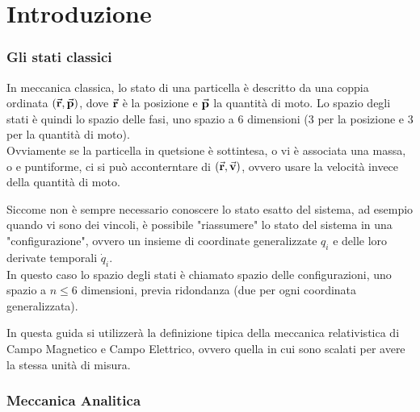 \section{Introduzione}
\subsubsection*{Gli stati classici} 
In meccanica classica, lo stato di una particella è descritto da una coppia ordinata $(\vec{\textbf{r}}, \vec{\textbf{p}})$, dove $\vec{\textbf{r}}$ è la posizione e $\vec{\textbf{p}}$ la quantità di moto. Lo spazio degli stati è quindi lo spazio delle fasi, uno spazio a 6 dimensioni (3 per la posizione e 3 per la quantità di moto).\\
Ovviamente se la particella in quetsione è sottintesa, o vi è associata una massa, o e puntiforme, ci si può acconterntare di $(\vec{\textbf{r}}, \vec{\textbf{v}})$, ovvero usare la velocità invece della quantità di moto.

Siccome non è sempre necessario conoscere lo stato esatto del sistema, ad esempio quando vi sono dei vincoli, è possibile "riassumere" lo stato del sistema in una "configurazione", ovvero un insieme di coordinate generalizzate $q_i$ e delle loro derivate temporali $\dot q_i$.\\
In questo caso lo spazio degli stati è chiamato spazio delle configurazioni, uno spazio a $n \le 6$ dimensioni, previa ridondanza (due per ogni coordinata generalizzata).

In questa guida si utilizzerà la definizione tipica della meccanica relativistica di Campo Magnetico e Campo Elettrico, ovvero quella in cui sono scalati per avere la stessa unità di misura.

\subsubsection*{Meccanica Analitica}

